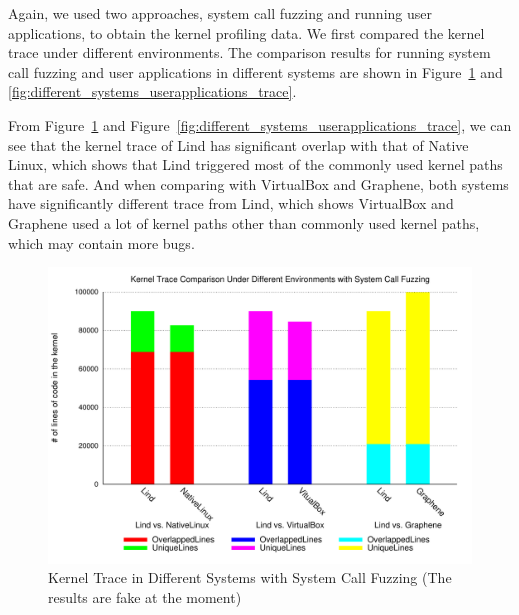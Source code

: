 
Again, we used two approaches, system call fuzzing and running user applications, to obtain the
kernel profiling data. 
%
We first compared the kernel trace under different environments.
The comparison results for running system call fuzzing and user applications in different systems 
are shown in Figure~\ref{fig:different_systems_systemcallfuzzing_trace} 
and \ref{fig:different_systems_userapplications_trace}.

From Figure~\ref{fig:different_systems_systemcallfuzzing_trace} and 
Figure~\ref{fig:different_systems_userapplications_trace}, we can see that the kernel trace of Lind has significant overlap with that of Native Linux, 
which shows that Lind triggered most of the commonly used kernel paths that are safe. And when comparing 
with VirtualBox and Graphene, both systems have significantly different trace from Lind, which shows VirtualBox and Graphene
used a lot of kernel paths other than commonly used kernel paths, which may contain more bugs.  

\begin{figure}%
\centering
\includegraphics[width=1.0\columnwidth]{diagram/lind_ccs15_diagram_03.pdf}
\caption{Kernel Trace in Different Systems with System Call Fuzzing {\color{red}(The results are fake at the moment)} }
\label{fig:different_systems_systemcallfuzzing_trace}
\end{figure}

